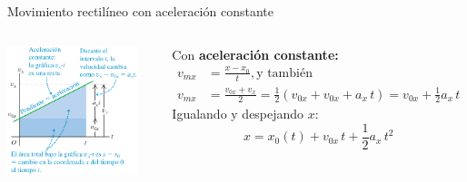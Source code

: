 \documentclass[9pt, aspectratio=169]{beamer}
\begin{document}
\begin{frame}{Movimiento rectilíneo con aceleración constante}
\begin{columns}
\begin{center}
    \includegraphics[width=0.9\textwidth]{figs/mrua-3.png}
\end{center}
Con \textbf{aceleración constante:}
\begin{align*} 
v_{mx} &= \frac{x - x_0}{t}, \text{y también}\\
v_{mx} &= \frac{v_{0x} + v_x}{2} = \frac{1}{2} (v_{0x} + v_{0x} + a_x \, t) = v_{0x} + \frac{1}{2} a_x \, t
\end{align*}
Igualando y despejando $x$:
\begin{equation} 
\boxed{ x = x_0(t) + v_{0x} \, t + \frac{1}{2} a_x \, t^2 } 
\label{eq:xt}
\end{equation}
\end{columns}
\end{frame}
\end{document}
